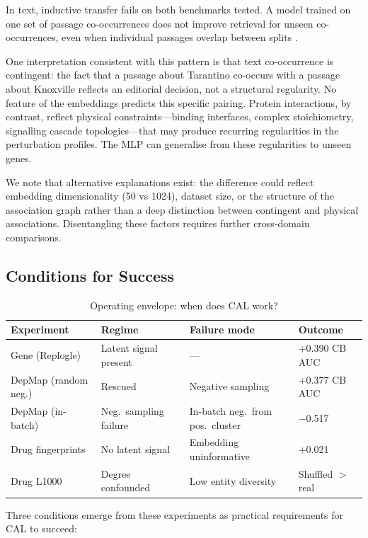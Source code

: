 \documentclass[11pt]{article}
\begin{document}
In text, inductive transfer fails on both benchmarks tested. A model trained on one set of passage co-occurrences does not improve retrieval for unseen co-occurrences, even when individual passages overlap between splits \citep{dury2026aar}.

One interpretation consistent with this pattern is that text co-occurrence is contingent: the fact that a passage about Tarantino co-occurs with a passage about Knoxville reflects an editorial decision, not a structural regularity. No feature of the embeddings predicts this specific pairing. Protein interactions, by contrast, reflect physical constraints---binding interfaces, complex stoichiometry, signalling cascade topologies---that may produce recurring regularities in the perturbation profiles. The MLP can generalise from these regularities to unseen genes.

We note that alternative explanations exist: the difference could reflect embedding dimensionality (50 vs 1024), dataset size, or the structure of the association graph rather than a deep distinction between contingent and physical associations. Disentangling these factors requires further cross-domain comparisons.

\subsection{Conditions for Success}
\label{sec:conditions}

\begin{table}[h]
\centering
\caption{Operating envelope: when does CAL work?}
\label{tab:envelope}
\begin{tabular}{llll}
\toprule
Experiment & Regime & Failure mode & Outcome \\
\midrule
Gene (Replogle) & Latent signal present & --- & +0.390 CB AUC \\
DepMap (random neg.) & Rescued & Negative sampling & +0.377 CB AUC \\
DepMap (in-batch) & Neg.\ sampling failure & In-batch neg.\ from pos.\ cluster & $-$0.517 \\
Drug fingerprints & No latent signal & Embedding uninformative & +0.021 \\
Drug L1000 & Degree confounded & Low entity diversity & Shuffled $>$ real \\
\bottomrule
\end{tabular}
\end{table}

Three conditions emerge from these experiments as practical requirements for CAL to succeed:
\end{document}
